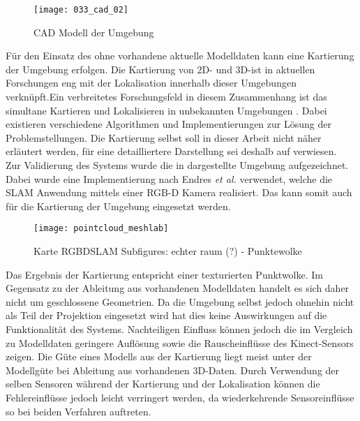 \begin{figure}[ht]
	\begin{center}
		\texttt{[image: 033\_cad\_02]}
		\caption{CAD Modell der Umgebung}
		\label{fig.mapMod}
	\end{center}
\end{figure}

Für den Einsatz des  ohne vorhandene aktuelle Modelldaten kann eine Kartierung \red[(Mapping)] der Umgebung erfolgen. Die Kartierung von 2D- und 3D- ist in aktuellen Forschungen eng mit der Lokalisation innerhalb dieser Umgebungen verknüpft. Ein verbreitetes Forschungsfeld in diesem Zusammenhang ist das simultane Kartieren und Lokalisieren in unbekannten Umgebungen . Dabei existieren verschiedene Algorithmen und Implementierungen zur Lösung der Problemstellungen. Die Kartierung selbst soll in dieser Arbeit nicht näher erläutert werden, für eine detailliertere Darstellung sei deshalb auf  verwiesen.\\

Zur Validierung des Systems wurde die in  dargestellte Umgebung aufgezeichnet. Dabei wurde eine Implementierung \cite{Rgbdslam} nach Endres \textit{et al.} \cite{Endres2014} verwendet, welche die SLAM Anwendung mittels einer RGB-D Kamera realisiert. Das \kps{} kann somit auch für die Kartierung der Umgebung eingesetzt werden.\\

\begin{figure}[ht]
	\begin{center}
		\texttt{[image: pointcloud\_meshlab]}
		\caption{Karte RGBDSLAM Subfigures: echter raum (?) - Punktewolke}
		\label{fig.mapSLAM}
	\end{center}
\end{figure}


Das Ergebnis der Kartierung entspricht einer texturierten Punktwolke. Im Gegensatz zu der Ableitung aus vorhandenen Modelldaten handelt es sich daher nicht um geschlossene Geometrien. Da die Umgebung selbst jedoch ohnehin nicht als Teil der Projektion eingesetzt wird hat dies keine Auswirkungen auf die Funktionalität des Systems. Nachteiligen Einfluss können jedoch die im Vergleich zu Modelldaten geringere Auflösung sowie die Rauscheinflüsse des Kinect-Sensors zeigen. Die Güte eines Modells aus der Kartierung liegt meist unter der Modellgüte bei Ableitung aus vorhandenen 3D-Daten. Durch Verwendung der selben Sensoren während der Kartierung und der Lokalisation können die Fehlereinflüsse jedoch leicht verringert werden, da wiederkehrende Sensoreinflüsse so bei beiden Verfahren auftreten.\\

